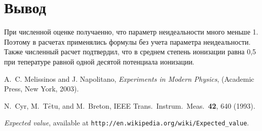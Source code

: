 \documentclass[letterpaper,12pt]{article} %
\begin{document}
\section{Вывод}
При численной оценке получаенно, что параметр неидеальности много меньше 1. Поэтому в расчетах применялись формулы без учета параметра неидеальности. Также численный расчет подтвердил, что в среднем степень ионизации равна 0,5 при тепературе равной одной десятой потенциала ионизации.


\begin{thebibliography}{99}

A.~C. Melissinos and J. Napolitano, \textit{Experiments in Modern Physics},
(Academic Press, New York, 2003).

N.\ Cyr, M.\ T$\hat{e}$tu, and M.\ Breton,
IEEE Trans.\ Instrum.\ Meas.\ \textbf{42}, 640 (1993).

 \emph{Expected value},  available at
\texttt{http://en.wikipedia.org/wiki/Expected\_value}.

\end{thebibliography}
\end{document}
